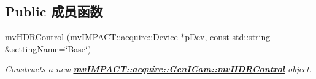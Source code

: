 \subsection*{Public 成员函数}
\begin{DoxyCompactItemize}
\item 
\hyperlink{classmv_i_m_p_a_c_t_1_1acquire_1_1_gen_i_cam_1_1mv_h_d_r_control_a94c5f8e733c4e061e88af9a4c15a1ac4}{mv\+H\+D\+R\+Control} (\hyperlink{classmv_i_m_p_a_c_t_1_1acquire_1_1_device}{mv\+I\+M\+P\+A\+C\+T\+::acquire\+::\+Device} $\ast$p\+Dev, const std\+::string \&setting\+Name=\char`\"{}Base\char`\"{})
\begin{DoxyCompactList}\small\item\em Constructs a new {\bfseries \hyperlink{classmv_i_m_p_a_c_t_1_1acquire_1_1_gen_i_cam_1_1mv_h_d_r_control}{mv\+I\+M\+P\+A\+C\+T\+::acquire\+::\+Gen\+I\+Cam\+::mv\+H\+D\+R\+Control}} object. \end{DoxyCompactList}\end{DoxyCompactItemize}
